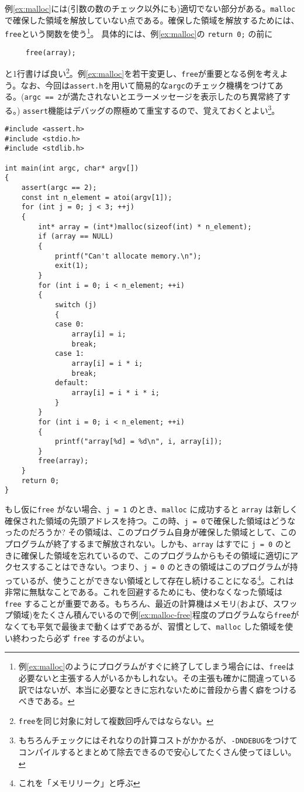 例\ref{ex:malloc}には(引数の数のチェック以外にも)適切でない部分がある。\texttt{malloc}で確保した領域を解放していない点である。確保した領域を解放するためには、\texttt{free}という関数を使う\footnote{例\ref{ex:malloc}のようにプログラムがすぐに終了してしまう場合には、\texttt{free}は必要ないと主張する人がいるかもしれない。その主張も確かに間違っている訳ではないが、本当に必要なときに忘れないために普段から書く癖をつけるべきである。}。
具体的には、例\ref{ex:malloc}の \texttt{return 0;} の前に
\begin{verbatim}
     free(array);
\end{verbatim}
と1行書けば良い\footnote{\texttt{free}を同じ対象に対して複数回呼んではならない。}。例\ref{ex:malloc}を若干変更し、\texttt{free}が重要となる例を考えよう。なお、今回は\texttt{assert.h}を用いて簡易的な\texttt{argc}のチェック機構をつけてある。(\texttt{argc == 2}が満たされないとエラーメッセージを表示したのち異常終了する。)
\texttt{assert}機能はデバッグの際極めて重宝するので、覚えておくとよい\footnote{もちろんチェックにはそれなりの計算コストがかかるが、\texttt{-DNDEBUG}をつけてコンパイルするとまとめて除去できるので安心してたくさん使ってほしい。}。
\begin{reidai}\label{ex:malloc-free}
    \begin{verbatim}
#include <assert.h>
#include <stdio.h>
#include <stdlib.h>

int main(int argc, char* argv[])
{
    assert(argc == 2);
    const int n_element = atoi(argv[1]);
    for (int j = 0; j < 3; ++j)
    {
        int* array = (int*)malloc(sizeof(int) * n_element);
        if (array == NULL)
        {
            printf("Can't allocate memory.\n");
            exit(1);
        }
        for (int i = 0; i < n_element; ++i)
        {
            switch (j)
            {
            case 0:
                array[i] = i;
                break;
            case 1:
                array[i] = i * i;
                break;
            default:
                array[i] = i * i * i;
            }
        }
        for (int i = 0; i < n_element; ++i)
        {
            printf("array[%d] = %d\n", i, array[i]);
        }
        free(array);
    }
    return 0;
}
\end{verbatim}
\end{reidai} \noindent
もし仮に\texttt{free} がない場合、\texttt{j = 1} のとき、\texttt{malloc} に成功すると \texttt{array} は新しく確保された領域の先頭アドレスを持つ。この時、\texttt{j = 0}で確保した領域はどうなったのだろうか? その領域は、このプログラム自身が確保した領域として、このプログラムが終了するまで解放されない。しかも、\texttt{array} はすでに \texttt{j = 0} のときに確保した領域を忘れているので、このプログラムからもその領域に適切にアクセスすることはできない。つまり、\texttt{j = 0} のときの領域はこのプログラムが持っているが、使うことができない領域として存在し続けることになる\footnote{これを「メモリリーク」と呼ぶ}。これは非常に無駄なことである。これを回避するためにも、使わなくなった領域は \texttt{free} することが重要である。もちろん、最近の計算機はメモリ(および、スワップ領域)をたくさん積んでいるので例\ref{ex:malloc-free}程度のプログラムなら\texttt{free}がなくても平気で最後まで動くはずであるが、習慣として、\texttt{malloc} した領域を使い終わったら必ず \texttt{free} するのがよい。

